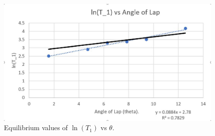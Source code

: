 \begin{figure}[H]
\centering
\includegraphics[width=1\textwidth]{chapters/lab2/graph1}
\caption{Equilibrium values of $\ln(T_1)$ vs $\theta$.}
\label{fig:mesh2}
\end{figure}